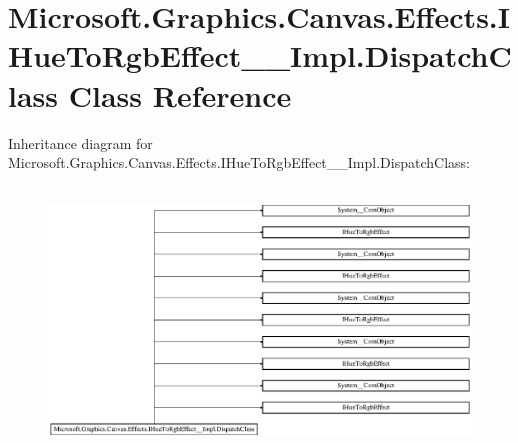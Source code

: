 \hypertarget{class_microsoft_1_1_graphics_1_1_canvas_1_1_effects_1_1_i_hue_to_rgb_effect_____impl_1_1_dispatch_class}{}\section{Microsoft.\+Graphics.\+Canvas.\+Effects.\+I\+Hue\+To\+Rgb\+Effect\+\_\+\+\_\+\+Impl.\+Dispatch\+Class Class Reference}
\label{class_microsoft_1_1_graphics_1_1_canvas_1_1_effects_1_1_i_hue_to_rgb_effect_____impl_1_1_dispatch_class}
Inheritance diagram for Microsoft.\+Graphics.\+Canvas.\+Effects.\+I\+Hue\+To\+Rgb\+Effect\+\_\+\+\_\+\+Impl.\+Dispatch\+Class\+:\begin{figure}[H]
\begin{center}
\leavevmode
\includegraphics[height=7.048055cm]{class_microsoft_1_1_graphics_1_1_canvas_1_1_effects_1_1_i_hue_to_rgb_effect_____impl_1_1_dispatch_class}
\end{center}
\end{figure}
